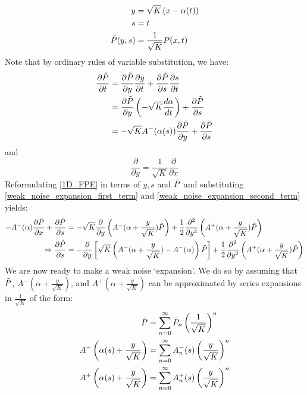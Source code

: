 \begin{align*}
    y &= \sqrt{K}\left(x-\alpha(t)\right)\\
    s &= t\\
    \Tilde{P}(y,s) &= \frac{1}{\sqrt{K}}P(x,t)
\end{align*}
Note that by ordinary rules of variable substitution, we have:
\begin{align}
    \frac{\partial \Tilde{P}}{\partial t} &= \frac{\partial \Tilde{P}}{\partial y}\frac{\partial y}{\partial t} + \frac{\partial \Tilde{P}}{\partial s}\frac{\partial s}{\partial t}\nonumber\\
    &=\frac{\partial \Tilde{P}}{\partial y}\left( -\sqrt{K}\frac{d\alpha}{dt}\right) + \frac{\partial \Tilde{P}}{\partial s}\nonumber\\
    &= -\sqrt{K}A^{-}(\alpha(s))\frac{\partial \Tilde{P}}{\partial y} + \frac{\partial \Tilde{P}}{\partial s}\label{weak_noise_expansion_first_term}
\end{align}
and
\begin{equation}
\label{weak_noise_expansion_second_term}
    \frac{\partial }{\partial y} = \frac{1}{\sqrt{K}}\frac{\partial }{\partial x}
\end{equation}
Reformulating \eqref{1D_FPE} in terms of $y,s$ and $\Tilde{P}$ and substituting \eqref{weak_noise_expansion_first_term} and \eqref{weak_noise_expansion_second_term} yields:
\begin{align}
-A^-(\alpha)\frac{\partial\Tilde{P}}{\partial x} + \frac{\partial \Tilde{P}}{\partial s} &= -\sqrt{K}\frac{\partial}{\partial y}\left(A^-(\alpha+\frac{y}{\sqrt{K}})\Tilde{P}\right)+\frac{1}{2}\frac{\partial^2}{\partial y^2}\left(A^+(\alpha+\frac{y}{\sqrt{K}})\Tilde{P}\right)\nonumber\\
\Rightarrow \frac{\partial \Tilde{P}}{\partial s} &= -\frac{\partial}{\partial y}\left[\sqrt{K}\left(A^-(\alpha+\frac{y}{\sqrt{K}})-A^-(\alpha)\right)\Tilde{P}\right]+\frac{1}{2}\frac{\partial^2}{\partial y^2}\left(A^+(\alpha+\frac{y}{\sqrt{K}})\Tilde{P}\right)\label{weak_noise_exact_equation}
\end{align}
We are now ready to make a weak noise `expansion'. We do so by assuming that $\Tilde{P}$, $A^-(\alpha + \frac{y}{\sqrt{K}})$, and $A^+(\alpha+\frac{y}{\sqrt{K}})$ can be approximated by series expansions in $\frac{1}{\sqrt{K}}$ of the form:
\begin{align*}
    \Tilde{P} &= \sum\limits_{n=0}^{\infty}\Tilde{P}_n\left(\frac{1}{\sqrt{K}}\right)^n\\
    A^-\left(\alpha(s) + \frac{y}{\sqrt{K}}\right) &= \sum\limits_{n=0}^{\infty}A^-_n(s)\left(\frac{y}{\sqrt{K}}\right)^n\\
    A^+\left(\alpha(s) + \frac{y}{\sqrt{K}}\right) &= \sum\limits_{n=0}^{\infty}A^+_n(s)\left(\frac{y}{\sqrt{K}}\right)^n
\end{align*}
